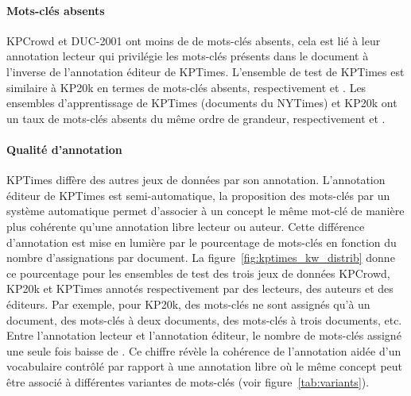 \paragraph{Mots-clés absents}

KPCrowd et DUC-2001 ont moins de  de mots-clés absents, cela est lié à leur annotation lecteur qui privilégie les mots-clés présents dans le document à l'inverse de l'annotation éditeur de KPTimes.
L'ensemble de test de KPTimes est similaire à KP20k en termes de mots-clés absents, respectivement  et . Les ensembles d'apprentissage de KPTimes (documents du NYTimes) et KP20k ont un taux de mots-clés absents du même ordre de grandeur, respectivement  et .  

\paragraph{Qualité d'annotation}
KPTimes diffère des autres jeux de données par son annotation. L'annotation éditeur de KPTimes est semi-automatique, la proposition des mots-clés par un système automatique permet d'associer à un concept le même mot-clé de manière plus cohérente qu'une annotation libre lecteur ou auteur.
%
Cette différence d'annotation est mise en lumière par le pourcentage de mots-clés en fonction du nombre d'assignations par document. 
La figure~\ref{fig:kptimes_kw_distrib} donne ce pourcentage pour les ensembles de test des trois jeux de données KPCrowd, KP20k et KPTimes annotés respectivement par des lecteurs, des auteurs et des éditeurs.
Par exemple, pour KP20k,  des mots-clés ne sont assignés qu'à un document,  des mots-clés à deux documents,  des mots-clés à trois documents, etc.
Entre l'annotation lecteur et l'annotation éditeur, le nombre de mots-clés assigné une seule fois baisse de . Ce chiffre révèle la cohérence de l'annotation aidée d'un vocabulaire contrôlé par rapport à une annotation libre où le même concept peut être associé à différentes variantes de mots-clés (voir figure~\ref{tab:variants}).



